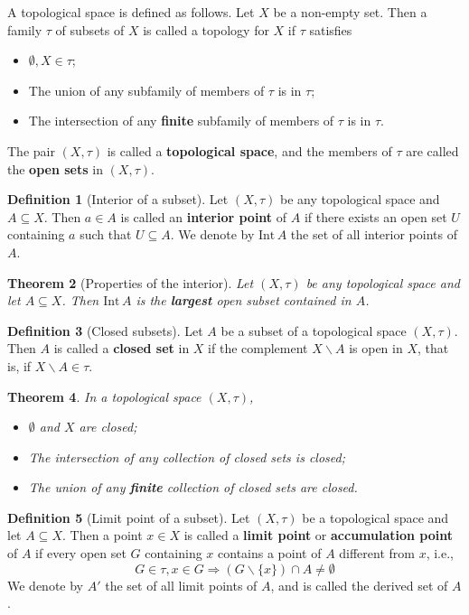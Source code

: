 \documentclass[10pt, oneside, reqno]{amsart}
\theoremstyle{plain}%
\newtheorem{thm}{Theorem}[section]
\theoremstyle{definition}
\newtheorem{defn}[thm]{Definition}
\theoremstyle{remark}
\newcommand{\topo}{(X,\tau)}
\newcommand{\intr}{\text{Int}\,}
\begin{document}
A topological space is defined as follows.  Let $X$ be a non-empty set.  Then a family $\tau$ of subsets of $X$ is called a topology for $X$ if $\tau$ satisfies 
\begin{itemize}
    \item $\emptyset, X \in \tau$;
    \item The union of any subfamily of members of $\tau$ is in $\tau$;
    \item The intersection of any \textbf{finite} subfamily of members of $\tau$ is in $\tau$.
\end{itemize}

The pair $(X, \tau)$ is called a \textbf{topological space}, and the members of $\tau$ are called the \textbf{open sets} in $(X, \tau)$. 


\begin{defn}[Interior of a subset]
    Let $\topo$ be any topological space and $A \subseteq X$.  Then $a \in A$ is called an \textbf{interior point} of $A$ if there exists an open set $U$ containing $a$ such that $U \subseteq A$.  We denote by $\intr A$ the set of all interior points of $A$.
\end{defn}

\begin{thm}[Properties of the interior]
    Let $\topo$ be any topological space and let $A \subseteq X$.  Then $\intr A$ is the \textbf{largest} open subset contained in $A$.
\end{thm}

\begin{defn}[Closed subsets]
    Let $A$ be a subset of a topological space $\topo$.  Then $A$ is called a \textbf{closed set} in $X$ if the complement $X \backslash A$ is open in $X$, that is, if $X \backslash A \in \tau$.
\end{defn}

\begin{thm}
    In a topological space $\topo$,
    \begin{itemize}
        \item $\emptyset$ and $X$ are closed;
        \item The intersection of any collection of closed sets is closed;
        \item The union of any \textbf{finite} collection of closed sets are closed.
    \end{itemize}
\end{thm}

\begin{defn}[Limit point of a subset]
    Let $\topo$ be a topological space and let $A \subseteq X$.  Then a point $x \in X$ is called a \textbf{limit point} or \textbf{accumulation point} of $A$ if every open set $G$ containing $x$ contains a point of $A$ different from $x$, i.e.,\[
        G \in \tau, x \in G \Rightarrow (G \backslash \{x \}) \cap A \neq \emptyset
    \]
We denote by $A'$ the set of all limit points of $A$, and is called the derived set of $A$.
\end{defn}
\end{document}
